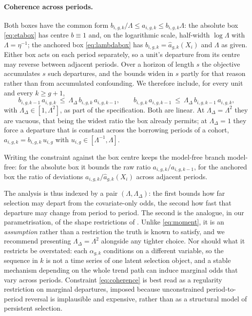 \documentclass[12pt]{article}
\theoremstyle{remark}
\begin{document}
\paragraph{Coherence across periods.} Both boxes have the common form
$b_{i,g,k}/\Lambda \le a_{i,g,k} \le b_{i,g,k}\Lambda$: the absolute box
\eqref{eq:etabox} has centre $b \equiv 1$ and, on the logarithmic scale, half-width
$\log\Lambda$ with $\Lambda = \eta^{-1}$; the anchored box \eqref{eq:lambdabox} has
$b_{i,g,k} = \widehat a_{g,k}(X_i)$ and $\Lambda$ as given. Either box acts on each period separately, so a unit's departure from its centre may
reverse between adjacent periods. Over a horizon of length $s$ the objective accumulates
$s$ such departures, and the bounds widen in $s$ partly for that reason rather than from
accumulated confounding. We therefore include, for every unit and every $k \ge g+1$,
\begin{equation}
b_{i,g,k-1}\,a_{i,g,k} \ \le\ \Lambda_\Delta\, b_{i,g,k}\,a_{i,g,k-1},
\qquad
b_{i,g,k}\,a_{i,g,k-1} \ \le\ \Lambda_\Delta\, b_{i,g,k-1}\,a_{i,g,k},
\label{eq:coherence}
\end{equation}
with $\Lambda_\Delta \in [1, \Lambda^2]$, as part of the specification. Both are linear.
At $\Lambda_\Delta = \Lambda^2$ they are vacuous, that being the widest ratio the box
already permits; at $\Lambda_\Delta = 1$ they force a departure that is constant across the borrowing
periods of a cohort, $a_{i,g,k} = b_{i,g,k}\,u_{i,g}$ with
$u_{i,g} \in [\Lambda^{-1}, \Lambda]$.

Writing the constraint against the box centre keeps the model-free branch model-free: for
the absolute box it bounds the raw ratio $a_{i,g,k}/a_{i,g,k-1}$, for the anchored box the
ratio of deviations $a_{i,g,k}/\widehat a_{g,k}(X_i)$ across adjacent periods.

The analysis is thus indexed by a pair $(\Lambda, \Lambda_\Delta)$: the first bounds how
far selection may depart from the covariate-only odds, the second how fast that departure
may change from period to period. The second is the analogue, in our parametrisation, of
the shape restrictions of \citet{rambachan2023honest}. Unlike \eqref{eq:moment}, it is an
\emph{assumption} rather than a restriction the truth is known to satisfy, and we
recommend presenting $\Lambda_\Delta = \Lambda^2$ alongside any tighter choice. Nor should
what it restricts be overstated: each $\alpha_{g,k}$ conditions on a different variable,
so the sequence in $k$ is not a time series of one latent selection object, and a stable
mechanism depending on the whole trend path can induce marginal odds that vary across
periods. Constraint \eqref{eq:coherence} is best read as a regularity restriction on
marginal departures, imposed because unconstrained period-to-period reversal is
implausible and expensive, rather than as a structural model of persistent selection.
\end{document}
